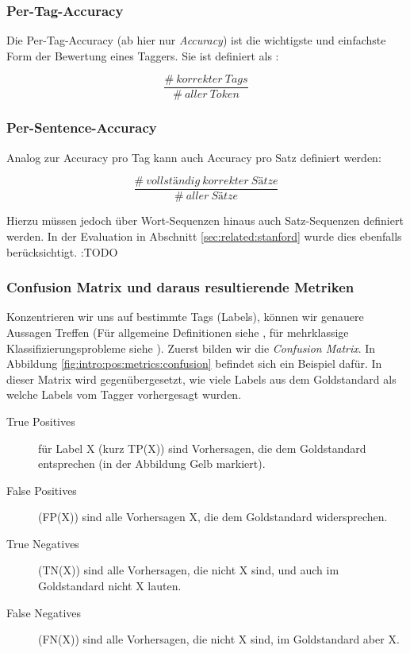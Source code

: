 \subsubsection{Per-Tag-Accuracy}

Die Per-Tag-Accuracy (ab hier nur \textit{Accuracy}) ist die wichtigste und einfachste Form der Bewertung eines Taggers. Sie ist definiert als \cite{Rao} :

\[ \frac{\# \: korrekter \:  Tags}{\# \: aller \:  Token} \]

\subsubsection{Per-Sentence-Accuracy}

Analog zur Accuracy pro Tag kann auch Accuracy pro Satz definiert werden:

\[ \frac{\# \: vollständig \: korrekter \:  Sätze}{\# \: aller \:  Sätze} \]

Hierzu müssen jedoch über Wort-Sequenzen hinaus auch Satz-Sequenzen definiert werden. In der Evaluation in Abschnitt \ref{sec:related:stanford} wurde dies ebenfalls berücksichtigt. :TODO

\subsubsection{Confusion Matrix und daraus resultierende Metriken}
Konzentrieren wir uns auf bestimmte Tags (Labels), können wir genauere Aussagen Treffen
(Für allgemeine Definitionen siehe \cite{Rao}, für mehrklassige Klassifizierungsprobleme siehe \cite{Web:rxnlp}). Zuerst bilden wir die \textit{Confusion Matrix}. In Abbildung \ref{fig:intro:pos:metrics:confusion} befindet sich ein Beispiel dafür. In dieser Matrix wird gegenübergesetzt, wie viele Labels aus dem Goldstandard als welche Labels vom Tagger vorhergesagt wurden.
\begin{description}

\item[True Positives] für Label X (kurz TP(X)) sind Vorhersagen, die dem Goldstandard entsprechen (in der Abbildung Gelb markiert).
\item[False Positives] (FP(X)) sind alle Vorhersagen X, die dem Goldstandard widersprechen.
\item[True Negatives] (TN(X)) sind alle Vorhersagen, die nicht X sind, und auch im Goldstandard nicht X lauten.
\item[False Negatives] (FN(X)) sind alle Vorhersagen, die nicht X sind, im Goldstandard aber X.
\end{description}

